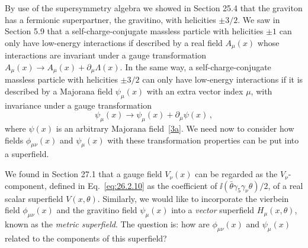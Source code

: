 By use of the supersymmetry algebra we showed in Section 25.4 that the
graviton has a fermionic superpartner, the gravitino, with helicities
\(\pm3/2\). We saw in Section 5.9 that a self-charge-conjugate massless
particle with helicities \(\pm1\) can only have low-energy interactions if
described by a real field \(A_\mu(x)\) whose interactions are invariant under
a gauge transformation
\(A_\mu(x)\to A_\mu(x)+\partial_\mu\Lambda(x)\). In the same way, a
self-charge-conjugate massless particle with helicities \(\pm3/2\) can only
have low-energy interactions if it is described by a Majorana field
\(\psi_\mu(x)\) with an extra vector index \(\mu\), with invariance under a
gauge transformation
\begin{equation}
  \psi_\mu(x)\to\psi_\mu(x)+\partial_\mu\psi(x)\,,
  \tag{31.1.13}\label{eq:31.1.13}
\end{equation}
where \(\psi(x)\) is an arbitrary Majorana
field~\hyperref[ch31-ref-3a]{[3a]}. We need now to consider how fields
\(\phi_{\mu\nu}(x)\) and \(\psi_\mu(x)\) with these transformation properties
can be put into a superfield.

We found in Section 27.1 that a gauge field \(V_\nu(x)\) can be regarded as
the \(V_\nu\)-component, defined in Eq.~\eqref{eq:26.2.10} as the coefficient
of \(\ii(\bar\theta\gamma_5\gamma_\nu\theta)/2\), of a real scalar superfield
\(V(x,\theta)\). Similarly, we would like to incorporate the vierbein field
\(\phi_{\mu\nu}(x)\) and the gravitino field \(\psi_\mu(x)\) into a
\emph{vector} superfield \(H_\mu(x,\theta)\), known as the \emph{metric
superfield}. The question is: how are \(\phi_{\mu\nu}(x)\) and
\(\psi_\mu(x)\) related to the components of this superfield?

